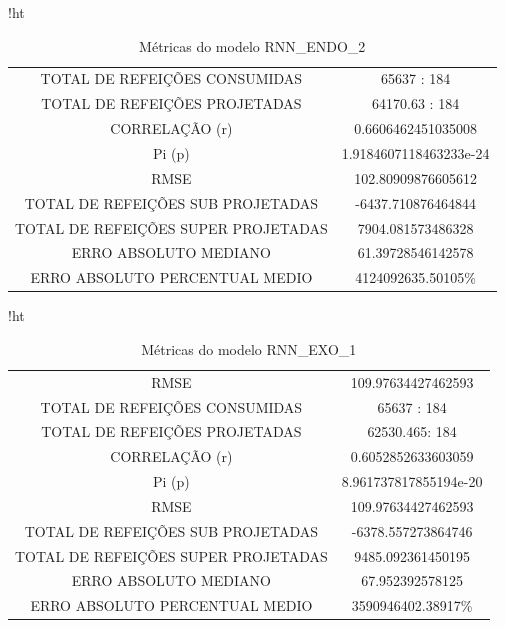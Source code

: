 \documentclass[	12pt, Times, openright, twoside, a4paper, english, brazil]{abntex2}
\begin{document}
            
             \begin{table}{!ht}
                \centering
                \caption{Métricas do modelo  RNN\_ENDO\_2 }
                    \begin{tabular}{|c|c|}
                    \rowcolor{gray!50}
                    \hline
                    \multicolumn{2}{c}{  RNN\_ENDO\_2} \\ \hline
            TOTAL DE REFEIÇÕES CONSUMIDAS & 65637 : 184 \\
            TOTAL DE REFEIÇÕES PROJETADAS & 64170.63 : 184 \\
            CORRELAÇÃO (r)&  0.6606462451035008\\ 
            Pi (p) & 1.9184607118463233e-24\\
            RMSE & 102.80909876605612\\
            TOTAL DE REFEIÇÕES SUB PROJETADAS & -6437.710876464844\\
            TOTAL DE REFEIÇÕES SUPER PROJETADAS & 7904.081573486328\\
            ERRO ABSOLUTO MEDIANO & 61.39728546142578 \\
            ERRO ABSOLUTO PERCENTUAL MEDIO &  4124092635.50105\% \\ \hline \end{tabular}           \end{table}
            
            
             \begin{table}{!ht}
                \centering
                \caption{Métricas do modelo  RNN\_EXO\_1 }
                    \begin{tabular}{|c|c|}
                    \rowcolor{gray!50}
                    \hline
            \multicolumn{2}{c}{RNN\_EXO\_1} \\ \hline
            RMSE &  109.97634427462593\\
            TOTAL DE REFEIÇÕES CONSUMIDAS & 65637 : 184 \\
            TOTAL DE REFEIÇÕES PROJETADAS & 62530.465: 184 \\
            CORRELAÇÃO (r)&  0.6052852633603059 \\
            Pi (p) & 8.961737817855194e-20\\
            RMSE & 109.97634427462593\\
            TOTAL DE REFEIÇÕES SUB PROJETADAS & -6378.557273864746\\
            TOTAL DE REFEIÇÕES SUPER PROJETADAS & 9485.092361450195\\
            ERRO ABSOLUTO MEDIANO & 67.952392578125\\
            ERRO ABSOLUTO PERCENTUAL MEDIO & 3590946402.38917\% \\  \hline \end{tabular} \end{table}
            
\end{document}
